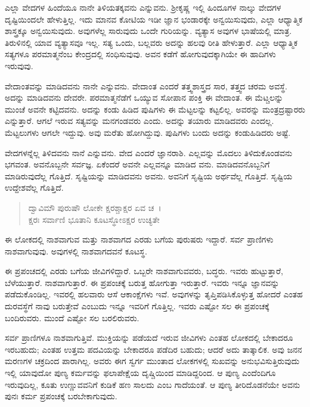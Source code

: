 ಎಲ್ಲಾ ವೇದಗಳ ಹಿಂದೆಯೂ ನಾನೇ ತಿಳಿಯತಕ್ಕವನು ಎನ್ನುವನು. ಶ‍್ರೀಕೃಷ್ಣ ಇಲ್ಲಿ ಹಿಂದೂಗಳ ನಾಲ್ಕು ವೇದಗಳ ದೃಷ್ಟಿಯಿಂದಲೇ ಹೇಳುತ್ತಿಲ್ಲ. ಇದು ಮಾನವ ಕೋಟಿಯ ಇಡೀ ಜ್ಞಾನ ಭಂಡಾರಕ್ಕೇ ಅನ್ವಯಿಸುವುದು, ಎಲ್ಲಾ ಆಧ್ಯಾತ್ಮಿಕ ಶಾಸ್ತ್ರಕ್ಕೂ ಅನ್ವಯಿಸುವುದು. ಅವುಗಳೆಲ್ಲ ಸಾರುವುದು ಒಂದೇ ಗುರಿಯನ್ನು. ವ್ಯತ್ಯಾಸ ಅವುಗಳ ಭಾಷೆಯಲ್ಲಿ ಮಾತ್ರ. ತಿರುಳಿನಲ್ಲಿ ಯಾವ ವ್ಯತ್ಯಾಸವೂ ಇಲ್ಲ. ಸತ್ಯ ಒಂದು, ಬಲ್ಲವರು ಅದನ್ನು ಹಲವು ರೀತಿ ಹೇಳುತ್ತಾರೆ. ಎಲ್ಲಾ ಆಧ್ಯಾತ್ಮಿಕ ಸತ್ಯಗಳೂ ಪರಮಾತ್ಮನೆಂಬ ಕೇಂದ್ರದಲ್ಲಿ ಸಂಧಿಸುವುವು. ಅವನ ಕಡೆಗೆ ಹೋಗುವುದಕ್ಕಾಗಿಯೇ ಈ ಹಾದಿಗಳು ಇರುವುವು.

ವೇದಾಂತವನ್ನು ಮಾಡಿದವನು ನಾನೇ ಎನ್ನುವನು. ವೇದಾಂತ ಎಂದರೆ ತತ್ತ್ವಶಾಸ್ತ್ರದ ಸಾರ, ತತ್ತ್ವದ ಚರಮ ಅವಸ್ಥೆ. ಅದನ್ನು ಮಾಡಿದವನು ದೇವರೇ. ಪರಮಾತ್ಮನೆಡೆಗೆ ಒಯ್ಯುವ ಸೋಪಾನ ಪಂಕ್ತಿ ಈ ವೇದಾಂತ. ಈ ಮೆಟ್ಚಲನ್ನು ಮುಂಚೆ ಅವನೇ ಕಟ್ಟಿದವನು. ಅದನ್ನು ಕಂಡು ಹಿಡಿದ ಪುಷಿಗಳು ಈ ಮೆಟ್ಟಲನ್ನು ಕಟ್ಟಲಿಲ್ಲ. ಅವರನ್ನು ಮಂತ್ರದ್ರಷ್ಟಾರರು ಎನ್ನುತ್ತಾರೆ. ಆಗಲೆ ಇರುವ ಸತ್ಯವನ್ನು ಮನಗಂಡವರು ಎಂದು. ಅದನ್ನು ತಯಾರು ಮಾಡಿದವರು ಎಂದಲ್ಲ. ಮೆಟ್ಟಲುಗಳು ಆಗಲೇ ಇದ್ದುವು. ಅವು ಮರೆತು ಹೋಗಿದ್ದುವು. ಪುಷಿಗಳು ಬಂದು ಅದನ್ನು ಕಂಡುಹಿಡಿದರು ಅಷ್ಟೆ.

ವೇದಗಳನ್ನೆಲ್ಲ ತಿಳಿದವನು ನಾನೆ ಎನ್ನುವನು. ವೇದ ಎಂದರೆ ಜ್ಞಾನರಾಶಿ. ಎಲ್ಲವನ್ನು ಮೊದಲು ತಿಳಿದುಕೊಂಡವನು ಭಗವಂತ. ಅವನೊಬ್ಬನೇ ಸರ್ವಜ್ಞ. ಏಕೆಂದರೆ ಅವನೇ ಎಲ್ಲವನ್ನೂ ಮಾಡಿದ ವನು. ಮಾಡಿದವನೊಬ್ಬನಿಗೆ ಮಾಡಿರುವುದೆಲ್ಲ ಗೊತ್ತಿದೆ. ಸೃಷ್ಟಿಯನ್ನು ಮಾಡಿದವನು ಅವನು. ಅವನಿಗೆ ಸೃಷ್ಟಿಯ ಅರ್ಥವೆಲ್ಲ ಗೊತ್ತಿದೆ. ಸೃಷ್ಟಿಯ ಉದ್ದೇಶವೆಲ್ಲ ಗೊತ್ತಿದೆ.

\begin{verse}
ದ್ವಾವಿಮೌ ಪುರುಷೌ ಲೋಕೇ ಕ್ಷರಶ್ಚಾಕ್ಷರ ಏವ ಚ~।\\ಕ್ಷರಃ ಸರ್ವಾಣಿ ಭೂತಾನಿ ಕೂಟಸ್ಥೋಽಕ್ಷರ ಉಚ್ಯತೇ 
\end{verse}

{\small ಈ ಲೋಕದಲ್ಲಿ ನಾಶವಾಗುವ ಮತ್ತು ನಾಶವಾಗದ ಎರಡು ಬಗೆಯ ಪುರುಷರು ಇದ್ದಾರೆ. ಸರ್ವ ಪ್ರಾಣಿಗಳು ನಾಶವಾಗುವುವು. ಅವುಗಳಲ್ಲಿ ನಾಶವಾಗದವನೆ ಕೂಟಸ್ಥ.}

ಈ ಪ್ರಪಂಚದಲ್ಲಿ ಎರಡು ಬಗೆಯ ಜೀವಿಗಳಿದ್ದಾರೆ. ಒಬ್ಬರೇ ನಾಶವಾಗುವವರು, ಬದ್ಧರು. ಇವರು ಹುಟ್ಟುತ್ತಾರೆ, ಬೆಳೆಯುತ್ತಾರೆ. ನಾಶವಾಗುತ್ತಾರೆ. ಈ ಪ್ರಪಂಚಕ್ಕೆ ಬರುತ್ತ ಹೋಗುತ್ತಾ ಇರುತ್ತಾರೆ. ಇವರು ಇನ್ನೂ ಜ್ಞಾನವನ್ನು ಪಡೆದುಕೊಂಡಿಲ್ಲ. ಇವರಲ್ಲಿ ಹಲವಾರು ಆಸೆ ಆಕಾಂಕ್ಷೆಗಳು ಇವೆ. ಅವುಗಳನ್ನು ತೃಪ್ತಿಪಡಿಸಿಕೊಳ್ಳುತ್ತ ಹೋದರೆ ಎಂತಹ ದುರವಸ್ಥೆಗೆ ನಾವು ಬರುತ್ತೇವೆ ಎಂಬುದು ಇನ್ನೂ ಇವರಿಗೆ ಗೊತ್ತಿಲ್ಲ. ಇವರು ಎಷ್ಟೋ ಸಲ ಈ ಪ್ರಪಂಚಕ್ಕೆ ಬಂದಿರುವರು. ಮುಂದೆ ಎಷ್ಟೋ ಸಲ ಬರಲಿರುವರು.

ಸರ್ವ ಪ್ರಾಣಿಗಳೂ ನಾಶವಾಗುತ್ತಿವೆ. ಮುಕ್ತಿಯನ್ನು ಪಡೆಯದೆ ಇರುವ ಜೀವಿಗಳು ಎಂತಹ ಲೋಕದಲ್ಲಿ ಬೇಕಾದರೂ ಇರಬಹುದು; ಎಂತಹ ಉತ್ತಮ ಪದವಿಯನ್ನು ಬೇಕಾದರೂ ಪಡೆದಿರ ಬಹುದು; ಆದರೆ ಅದು ತಾತ್ಕಾಲಿಕ. ಅವು ಜನನ ಮರಣಗಳ ಚಕ್ರದಿಂದ ಪಾರಾಗಿಲ್ಲ. ಅವರು ಈಗ ಸ್ವರ್ಗ ಮುಂತಾದ ಲೋಕಗಳಲ್ಲಿ ಸುಖವನ್ನು ಅನುಭವಿಸುತ್ತಿರುವುದು ಇಲ್ಲಿ ಯಾವುದೋ ಪುಣ್ಯ ಕರ್ಮವನ್ನು ಫಲಾಪೇಕ್ಷೆಯ ದೃಷ್ಚಿಯಿಂದ ಮಾಡಿದ್ದರಿಂದ. ಆ ಪುಣ್ಯ ಎಂದೆಂದಿಗೂ ಇರುವುದಿಲ್ಲ, ಕೂತು ಉಣ್ಣುವವನಿಗೆ ಕುಡಿಕೆ ಹಣ ಸಾಲದು ಎಂಬ ಗಾದೆಯಂತೆ. ಆ ಪುಣ್ಯ ತೀರಿದೊಡನೆಯೇ ಅವನು ಪುನಃ ಕರ್ಮ ಪ್ರಪಂಚಕ್ಕೆ ಬರಬೇಕಾಗುವುದು.

